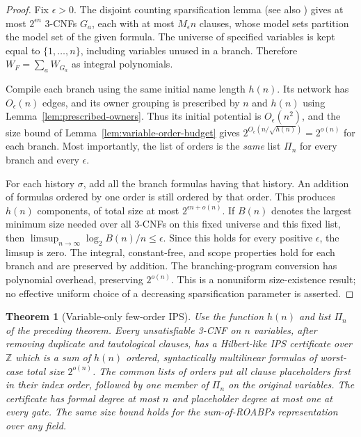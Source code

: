\documentclass[11pt]{article}
\newtheorem{theorem}{Theorem}[section]
\theoremstyle{definition}
\theoremstyle{remark}
\begin{document}
\begin{proof}
Fix $\epsilon>0$. The disjoint counting sparsification lemma
\cite[Lemma~4]{Ant26} (see also \cite[Section~2, assumption~(A1)]{Szeider26})
gives
at most $2^{\epsilon n}$ 3-CNFs $G_a$, each with at most
$M_\epsilon n$ clauses, whose model sets partition the model set of
the given formula. The universe of specified variables is kept equal
to $\{1,\ldots,n\}$, including variables unused in a branch.
Therefore $W_F=\sum_a W_{G_a}$ as integral polynomials.

Compile each branch using the same initial name length $h(n)$.
Its network has $O_\epsilon(n)$ edges, and its owner grouping is
prescribed by $n$ and $h(n)$ using
Lemma~\ref{lem:prescribed-owners}. Thus its initial potential is
$O_\epsilon(n^2)$, and the size bound of Lemma~\ref{lem:variable-order-budget} gives
$2^{O_\epsilon(n/\sqrt{h(n)})}=2^{o(n)}$ for each branch.
Most importantly, the list of orders is the \emph{same} list
$\Pi_n$ for every branch and every $\epsilon$.

For each history $\sigma$, add all the branch formulas having that
history. An addition of formulas ordered by one order is still
ordered by that order. This produces $h(n)$ components, of total
size at most $2^{\epsilon n+o(n)}$. If $B(n)$ denotes the largest
minimum size needed over all 3-CNFs on this fixed universe and this
fixed list, then $\limsup_{n\to\infty}\log_2 B(n)/n\le\epsilon$.
Since this holds for every positive $\epsilon$, the limsup is zero.
The integral, constant-free, and scope properties hold for each
branch and are preserved by addition. The branching-program
conversion has polynomial overhead, preserving $2^{o(n)}$.
This is a nonuniform size-existence result; no effective uniform
choice of a decreasing sparsification parameter is asserted.
\end{proof}

\begin{theorem}[Variable-only few-order IPS]
\label{thm:universal-variable-order-ips}
Use the function $h(n)$ and list $\Pi_n$ of the preceding theorem.
Every unsatisfiable 3-CNF on $n$ variables, after removing duplicate
and tautological clauses, has a Hilbert-like IPS certificate over
$\mathbb Z$ which is a sum of $h(n)$ ordered, syntactically
multilinear formulas of worst-case total size $2^{o(n)}$.
The common lists of orders put all clause placeholders first in
their index order, followed by one member of $\Pi_n$ on the original
variables. The certificate has formal degree at most $n$ and
placeholder degree at most one at every gate. The same size bound
holds for the sum-of-ROABPs representation over any field.
\end{theorem}
\end{document}
